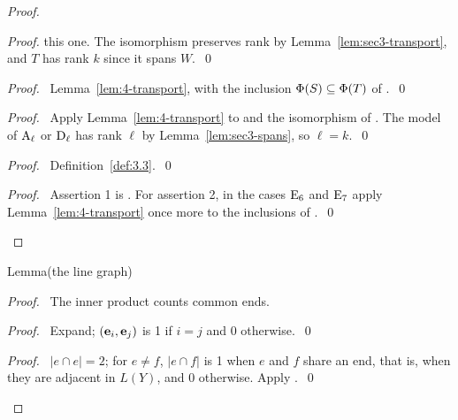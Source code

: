 \begin{proof}
\begin{proof}
  this one. The isomorphism preserves rank by Lemma~\ref{lem:sec3-transport}, and $T$ has rank
  $k$ since it spans $W$.~\qed\end{proof}
 \begin{proof}\pf\ Lemma~\ref{lem:4-transport}, with the inclusion $\Phi(S)\subseteq\Phi(T)$ of
  .~\qed\end{proof}
 \begin{proof}\pf\ Apply Lemma~\ref{lem:4-transport} to  and the isomorphism
  of . The model of $\mathrm{A}_\ell$ or $\mathrm{D}_\ell$ has rank $\ell$ by
  Lemma~\ref{lem:sec3-spans}, so $\ell=k$.~\qed\end{proof}
 \begin{proof}\pf\ Definition~\ref{def:3.3}.~\qed\end{proof}
 \qedstep
 \begin{proof}\pf\ Assertion 1 is . For assertion 2, in the cases $\mathrm{E}_6$
  and $\mathrm{E}_7$ apply Lemma~\ref{lem:4-transport} once more to the inclusions of
  .~\qed\end{proof}
\end{proof}

\begin{namedresult}{Lemma}{(the line graph)}\label{lem:4-linegraph}
\end{namedresult}
\begin{proof}
 \pfsketch\ The inner product counts common ends.
 \begin{proof}\pf\ Expand; $({\mathbf e}_i,{\mathbf e}_j)$ is 1 if $i=j$ and 0
  otherwise.~\qed\end{proof}
 \qedstep
 \begin{proof}\pf\ $|e\cap e|=2$; for $e\ne f$, $|e\cap f|$ is 1 when $e$ and $f$ share an end,
  that is, when they are adjacent in $L(Y)$, and 0 otherwise. Apply
  .~\qed\end{proof}
\end{proof}


